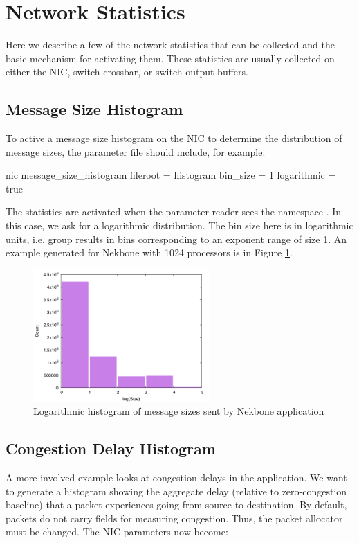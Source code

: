 

\section{Network Statistics}
\label{sec:tutorials:packetStats}

Here we describe a few of the network statistics that can be collected and the basic mechanism for activating them.
These statistics are usually collected on either the NIC, switch crossbar, or switch output buffers.

\subsection{Message Size Histogram}
To active a message size histogram on the NIC to determine the distribution of message sizes, the parameter file should include, for example:

\begin{ViFile}
nic {
 message_size_histogram {
   fileroot = histogram
   bin_size = 1
   logarithmic = true
 }
}
\end{ViFile}
The statistics are activated when the parameter reader sees the namespace .
In this case, we ask for a logarithmic distribution.
The bin size here is in logarithmic units, i.e. group results in bins corresponding to an exponent range of size 1.
An example generated for Nekbone with 1024 processors is in Figure \ref{fig:nekboneSizeHistogram}.

\begin{figure}
\centering
\includegraphics[width=0.6\textwidth]{figures/messageSizeHistogramNekbone}
\caption{Logarithmic histogram of message sizes sent by Nekbone application}
\label{fig:nekboneSizeHistogram}
\end{figure}

\subsection{Congestion Delay Histogram}
A more involved example looks at congestion delays in the application.
We want to generate a histogram showing the aggregate delay (relative to zero-congestion baseline) that a packet experiences
going from source to destination.
By default, packets do not carry fields for measuring congestion. 
Thus, the packet allocator must be changed.
The NIC parameters now become:

